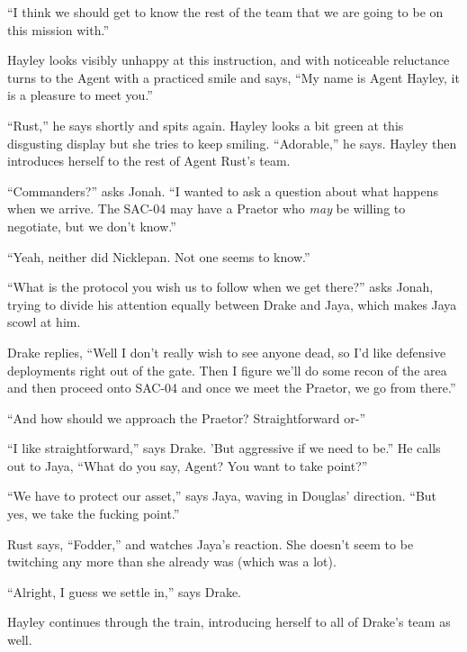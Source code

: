 ``I think we should get to know the rest of the team that we are going to be on this mission with.''

Hayley looks visibly unhappy at this instruction, and with noticeable reluctance turns to the Agent with a practiced smile and says, ``My name is Agent Hayley, it is a pleasure to meet you.''

``Rust,'' he says shortly and spits again.  Hayley looks a bit green at this disgusting display but she tries to keep smiling.  ``Adorable,'' he says.  Hayley then introduces herself to the rest of Agent Rust's team.

``Commanders?'' asks Jonah.  ``I wanted to ask a question about what happens when we arrive.  The SAC-04 may have a Praetor who \textit{may} be willing to negotiate, but we don't know.''

``Yeah, neither did Nicklepan.  Not one seems to know.''

``What is the protocol you wish us to follow when we get there?'' asks Jonah, trying to divide his attention equally between Drake and Jaya, which makes Jaya scowl at him.

Drake replies, ``Well I don't really wish to see anyone dead, so I'd like defensive deployments right out of the gate.  Then I figure we'll do some recon of the area and then proceed onto SAC-04 and once we meet the Praetor, we go from there.''

``And how should we approach the Praetor?  Straightforward or-''

``I like straightforward,'' says Drake.  'But aggressive if we need to be.''  He calls out to Jaya, ``What do you say, Agent?  You want to take point?''

``We have to protect our asset,'' says Jaya, waving in Douglas' direction.  ``But yes, we take the fucking point.''

Rust says, ``Fodder,'' and watches Jaya's reaction.  She doesn't seem to be twitching any more than she already was (which was a lot).

``Alright, I guess we settle in,'' says Drake.

Hayley continues through the train, introducing herself to all of Drake's team as well.  


